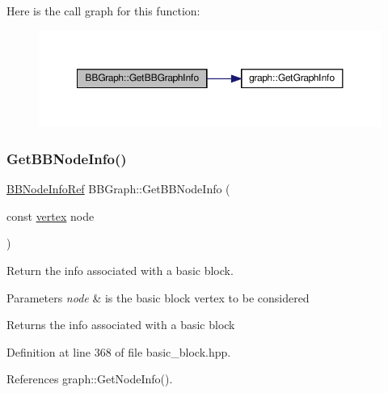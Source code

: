 Here is the call graph for this function\+:
\nopagebreak
\begin{figure}[H]
\begin{center}
\leavevmode
\includegraphics[width=350pt]{dd/d5f/structBBGraph_ad0b39f19870684dc311670bfcfa0549b_cgraph}
\end{center}
\end{figure}
\mbox{\label{structBBGraph_aab31f928508260163e2e5cd30083e49f}} 
\subsubsection{\texorpdfstring{Get\+B\+B\+Node\+Info()}{GetBBNodeInfo()}}
{\footnotesize\ttfamily \hyperlink{basic__block_8hpp_a3e08f6abf5bad7d4434f60438049fcf9}{B\+B\+Node\+Info\+Ref} B\+B\+Graph\+::\+Get\+B\+B\+Node\+Info (\begin{DoxyParamCaption}\item[{const \hyperlink{graph_8hpp_abefdcf0544e601805af44eca032cca14}{vertex}}]{node }\end{DoxyParamCaption})\hspace{0.3cm}{\ttfamily [inline]}}



Return the info associated with a basic block. 


\begin{DoxyParams}{Parameters}
{\em node} & is the basic block vertex to be considered \\
\hline
\end{DoxyParams}
\begin{DoxyReturn}{Returns}
the info associated with a basic block 
\end{DoxyReturn}


Definition at line 368 of file basic\+\_\+block.\+hpp.



References graph\+::\+Get\+Node\+Info().



